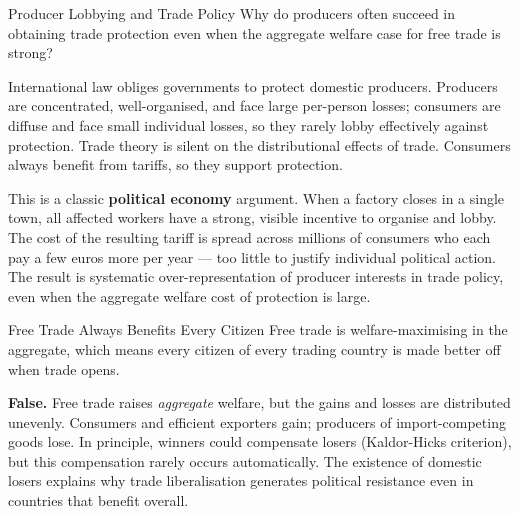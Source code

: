 \documentclass[paper=a5]{scrartcl}
\begin{document}
\begin{question}[type=mc]{Producer Lobbying and Trade Policy}
Why do producers often succeed in obtaining trade protection even when the
aggregate welfare case for free trade is strong?
\begin{choices}
  \choice        International law obliges governments to protect domestic
                 producers.
  \correctchoice Producers are concentrated, well-organised, and face large
                 per-person losses; consumers are diffuse and face small
                 individual losses, so they rarely lobby effectively against
                 protection.
  \choice        Trade theory is silent on the distributional effects of trade.
  \choice        Consumers always benefit from tariffs, so they support
                 protection.
\end{choices}
\begin{solution}
  This is a classic \textbf{political economy} argument. When a factory closes
  in a single town, all affected workers have a strong, visible incentive to
  organise and lobby. The cost of the resulting tariff is spread across
  millions of consumers who each pay a few euros more per year --- too little
  to justify individual political action. The result is systematic
  over-representation of producer interests in trade policy, even when the
  aggregate welfare cost of protection is large.
\end{solution}
\end{question}

\begin{question}[type=tf]{Free Trade Always Benefits Every Citizen}
Free trade is welfare-maximising in the aggregate, which means every citizen
of every trading country is made better off when trade opens.
\truefalse[false]
\begin{solution}
  \textbf{False.} Free trade raises \emph{aggregate} welfare, but the gains
  and losses are distributed unevenly. Consumers and efficient exporters gain;
  producers of import-competing goods lose. In principle, winners could
  compensate losers (Kaldor-Hicks criterion), but this compensation rarely
  occurs automatically. The existence of domestic losers explains why trade
  liberalisation generates political resistance even in countries that benefit
  overall.
\end{solution}
\end{question}
\end{document}
